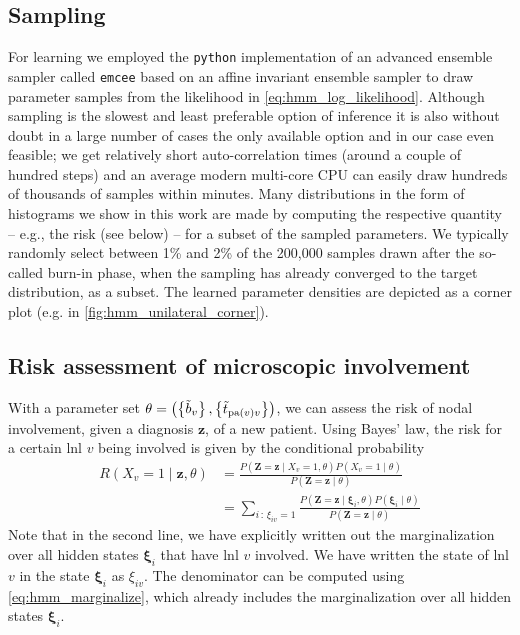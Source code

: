 \documentclass[../ms.tex]{subfiles}
\begin{document}
\subsection{Sampling}
\label{subsec:hmm_sampling}

For learning we employed the \verb|python| implementation of an advanced ensemble sampler called \verb|emcee| \cite{foreman-mackey_emcee_2013} based on an affine invariant ensemble sampler \cite{goodman_ensemble_2010} to draw parameter samples from the likelihood in \cref{eq:hmm_log_likelihood}. Although sampling is the slowest and least preferable option of inference it is also without doubt in a large number of cases the only available option and in our case even feasible; we get relatively short auto-correlation times (around a couple of hundred steps) and an average modern multi-core CPU can easily draw hundreds of thousands of samples within minutes.
Many distributions in the form of histograms we show in this work are made by computing the respective quantity – e.g., the risk (see below) – for a subset of the sampled parameters. We typically randomly select between 1\% and 2\% of the 200,000 samples drawn after the so-called burn-in phase, when the sampling has already converged to the target distribution, as a subset. The learned parameter densities are depicted as a corner \cite{foreman-mackey_cornerpy_2016} plot (e.g. in \cref{fig:hmm_unilateral_corner}).

\subsection{Risk assessment of microscopic involvement}
\label{subsec:hmm_risk_assessment}

With a parameter set $\theta = \left( \left\{ \Tilde{b}_v \right\}, \left\{ \Tilde{t}_{\operatorname{pa}(v)v} \right\} \right)$, we can assess the risk of nodal involvement, given a diagnosis $\mathbf{z}$, of a new patient. Using Bayes’ law, the risk for a certain \gls{lnl} $v$ being involved is given by the conditional probability
%
\begin{equation}
    \begin{aligned}
        R \left( X_v=1 \mid \mathbf{z}, \theta \right) 
        &= \frac{P \left( \mathbf{Z}=\mathbf{z} \mid X_v=1, \theta \right) P \left( X_v=1 \mid \theta \right)}{P \left( \mathbf{Z}=\mathbf{z} \mid \theta \right)} \\
        &= \sum_{i\,:\,\xi_{iv}=1}{\frac{P \left( \mathbf{Z}=\mathbf{z} \mid \boldsymbol{\xi}_i , \theta \right) P \left( \boldsymbol{\xi}_i \mid \theta \right)}{P \left( \mathbf{Z}=\mathbf{z} \mid \theta \right)}}
    \end{aligned}
\end{equation}
%
Note that in the second line, we have explicitly written out the marginalization over all hidden states $\boldsymbol{\xi}_i$ that have \gls{lnl} $v$ involved. We have written the state of \gls{lnl} $v$ in the state $\boldsymbol{\xi}_i$ as $\xi_{iv}$. The denominator can be computed using \cref{eq:hmm_marginalize}, which already includes the marginalization over all hidden states $\boldsymbol{\xi}_i$.
\end{document}

